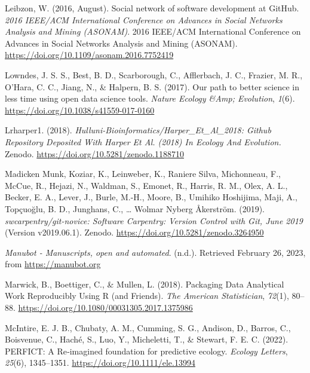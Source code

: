 \begin{CSLReferences}{1}{0}
\leavevmode{}%
Leibzon, W. (2016, August). Social network of software development at GitHub. \emph{2016 IEEE/ACM International Conference on Advances in Social Networks Analysis and Mining (ASONAM)}. 2016 IEEE/ACM International Conference on Advances in Social Networks Analysis and Mining (ASONAM). \url{https://doi.org/10.1109/asonam.2016.7752419}

\leavevmode{}%
Lowndes, J. S. S., Best, B. D., Scarborough, C., Afflerbach, J. C., Frazier, M. R., O'Hara, C. C., Jiang, N., \& Halpern, B. S. (2017). Our path to better science in less time using open data science tools. \emph{Nature Ecology \&Amp; Evolution}, \emph{1}(6). \url{https://doi.org/10.1038/s41559-017-0160}

\leavevmode{}%
Lrharper1. (2018). \emph{Hulluni-Bioinformatics/Harper\_Et\_Al\_2018: Github Repository Deposited With Harper Et Al. (2018) In Ecology And Evolution.} Zenodo. \url{https://doi.org/10.5281/zenodo.1188710}

\leavevmode{}%
Madicken Munk, Koziar, K., Leinweber, K., Raniere Silva, Michonneau, F., McCue, R., Hejazi, N., Waldman, S., Emonet, R., Harris, R. M., Olex, A. L., Becker, E. A., Lever, J., Burle, M.-H., Moore, B., Umihiko Hoshijima, Maji, A., Topçuoğlu, B. D., Junghans, C., \ldots{} Wolmar Nyberg Åkerström. (2019). \emph{swcarpentry/git-novice: Software Carpentry: Version Control with Git, June 2019} (Version v2019.06.1). Zenodo. \url{https://doi.org/10.5281/zenodo.3264950}

\leavevmode{}%
\emph{Manubot - Manuscripts, open and automated}. (n.d.). Retrieved February 26, 2023, from \url{https://manubot.org}

\leavevmode{}%
Marwick, B., Boettiger, C., \& Mullen, L. (2018). Packaging Data Analytical Work Reproducibly Using R (and Friends). \emph{The American Statistician}, \emph{72}(1), 80--88. \url{https://doi.org/10.1080/00031305.2017.1375986}

\leavevmode{}%
McIntire, E. J. B., Chubaty, A. M., Cumming, S. G., Andison, D., Barros, C., Boisvenue, C., Haché, S., Luo, Y., Micheletti, T., \& Stewart, F. E. C. (2022). PERFICT: A Re‐imagined foundation for predictive ecology. \emph{Ecology Letters}, \emph{25}(6), 1345--1351. \url{https://doi.org/10.1111/ele.13994}


\end{CSLReferences}
